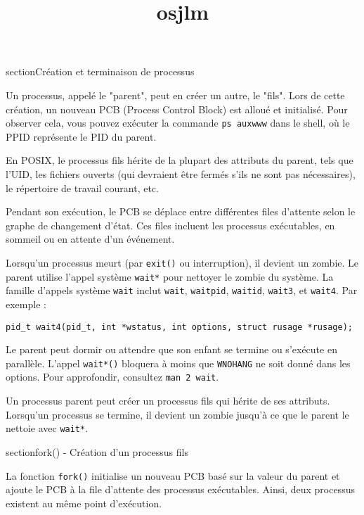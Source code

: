 \documentclass[12pt]{article}
\title{osjlm}
\author{}
\date{}
\begin{document}
\maketitle
\tableofcontents
\newpage

section{Création et terminaison de processus}

Un processus, appelé le "parent", peut en créer un autre, le "fils". Lors de cette création, un nouveau PCB (Process Control Block) est alloué et initialisé. Pour observer cela, vous pouvez exécuter la commande \texttt{ps auxwww} dans le shell, où le PPID représente le PID du parent.

En POSIX, le processus fils hérite de la plupart des attributs du parent, tels que l'UID, les fichiers ouverts (qui devraient être fermés s'ils ne sont pas nécessaires), le répertoire de travail courant, etc.

Pendant son exécution, le PCB se déplace entre différentes files d'attente selon le graphe de changement d'état. Ces files incluent les processus exécutables, en sommeil ou en attente d'un événement.

Lorsqu'un processus meurt (par \texttt{exit()} ou interruption), il devient un zombie. Le parent utilise l'appel système \texttt{wait*} pour nettoyer le zombie du système. La famille d'appels système \texttt{wait} inclut \texttt{wait}, \texttt{waitpid}, \texttt{waitid}, \texttt{wait3}, et \texttt{wait4}. Par exemple :

\begin{lstlisting}
pid_t wait4(pid_t, int *wstatus, int options, struct rusage *rusage);
\end{lstlisting}

Le parent peut dormir ou attendre que son enfant se termine ou s'exécute en parallèle. L'appel \texttt{wait*()} bloquera à moins que \texttt{WNOHANG} ne soit donné dans les options. Pour approfondir, consultez \texttt{man 2 wait}.

\begin{tcolorbox}[title={À retenir}]
Un processus parent peut créer un processus fils qui hérite de ses attributs. Lorsqu'un processus se termine, il devient un zombie jusqu'à ce que le parent le nettoie avec \texttt{wait*}.
\end{tcolorbox}

section{fork() - Création d'un processus fils}

La fonction \texttt{fork()} initialise un nouveau PCB basé sur la valeur du parent et ajoute le PCB à la file d'attente des processus exécutables. Ainsi, deux processus existent au même point d'exécution.
\end{document}
